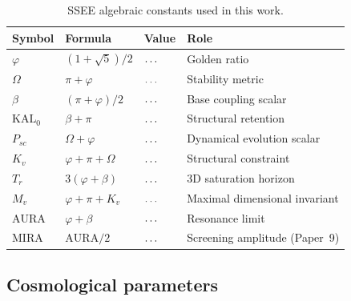 \documentclass[12pt,a4paper]{article}
\begin{document}
\begin{table}[ht]
\centering
\caption{SSEE algebraic constants used in this work.}
\label{tab:constants}
\begin{tabular}{llll}
\toprule
Symbol & Formula & Value & Role \\
\midrule
$\varphi$ & $(1+\sqrt{5})/2$ & $\val{PHI_d5}\ldots$ & Golden ratio \\
$\Omega$ & $\pi+\varphi$ & $\val{OMEGA_d5}\ldots$ & Stability metric \\
$\beta$   & $(\pi+\varphi)/2$ & $\val{BETA_d5}\ldots$ & Base coupling scalar \\
$\mathrm{KAL}_0$ & $\beta+\pi$ & $\val{KAL0_d5}\ldots$ & Structural retention \\
$P_{sc}$  & $\Omega+\varphi$ & $\val{P_SC_d5}\ldots$ & Dynamical evolution scalar \\
$K_v$     & $\varphi+\pi+\Omega$ & $\val{K_V_d5}\ldots$ & Structural constraint \\
$T_r$     & $3(\varphi+\beta)$ & $\val{T_R_d5}\ldots$ & 3D saturation horizon \\
$M_v$     & $\varphi+\pi+K_v$ & $\val{M_V_d5}\ldots$ & Maximal dimensional invariant \\
\midrule
$\mathrm{AURA}$ & $\varphi+\beta$ & $\val{AURA_d5}\ldots$ & Resonance limit \\
$\mathrm{MIRA}$ & $\mathrm{AURA}/2$ & $\val{MIRA_d5}\ldots$ & Screening amplitude (Paper~9) \\
\bottomrule
\end{tabular}
\end{table}

\subsection{Cosmological parameters}
\end{document}
